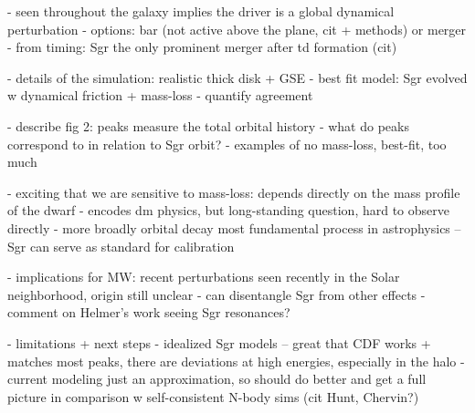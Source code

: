\documentclass{natureprintstyle}
\begin{document}
- seen throughout the galaxy implies the driver is a global dynamical perturbation
- options: bar (not active above the plane, cit + methods) or merger
- from timing: Sgr the only prominent merger after td formation (cit)


- details of the simulation: realistic thick disk + GSE
- best fit model: Sgr evolved w dynamical friction + mass-loss
- quantify agreement

- describe fig 2: peaks measure the total orbital history
- what do peaks correspond to in relation to Sgr orbit?
- examples of no mass-loss, best-fit, too much

- exciting that we are sensitive to mass-loss: depends directly on the mass profile of the dwarf
- encodes dm physics, but long-standing question, hard to observe directly
- more broadly orbital decay most fundamental process in astrophysics -- Sgr can serve as standard for calibration

- implications for MW: recent perturbations seen recently in the Solar neighborhood, origin still unclear
- can disentangle Sgr from other effects
- comment on Helmer's work seeing Sgr resonances?

- limitations + next steps
- idealized Sgr models -- great that CDF works + matches most peaks, there are deviations at high energies, especially in the halo
- current modeling just an approximation, so should do better and get a full picture in comparison w self-consistent N-body sims (cit Hunt, Chervin?)




% 
{\small}
\end{document}
